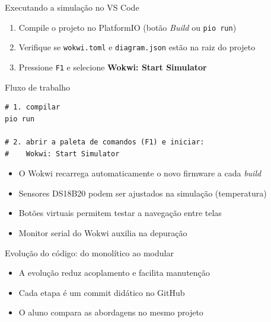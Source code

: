 \documentclass[aspectratio=169]{beamer}
\begin{document}
\begin{frame}[fragile]{Executando a simulação no VS Code}
    \begin{enumerate}
        \item Compile o projeto no PlatformIO (botão \textit{Build} ou \texttt{pio run})
        \item Verifique se \texttt{wokwi.toml} e \texttt{diagram.json} estão na raiz do projeto
        \item Pressione \texttt{F1} e selecione \textbf{Wokwi: Start Simulator}
    \end{enumerate}
    \vfill
    \begin{block}{Fluxo de trabalho}
        \begin{verbatim}
# 1. compilar
pio run

# 2. abrir a paleta de comandos (F1) e iniciar:
#    Wokwi: Start Simulator
        \end{verbatim}
    \end{block}
    \begin{itemize}
        \item O Wokwi recarrega automaticamente o novo firmware a cada \textit{build}
        \item Sensores DS18B20 podem ser ajustados na simulação (temperatura)
        \item Botões virtuais permitem testar a navegação entre telas
        \item Monitor serial do Wokwi auxilia na depuração
    \end{itemize}
\end{frame}

\begin{frame}{Evolução do código: do monolítico ao modular}
    \centering
    \vfill
    \begin{itemize}
        \item A evolução reduz acoplamento e facilita manutenção
        \item Cada etapa é um commit didático no GitHub
        \item O aluno compara as abordagens no mesmo projeto
    \end{itemize}
\end{frame}
\end{document}
